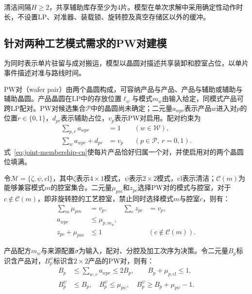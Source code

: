 \documentclass[final,5p,times,twocolumn]{elsarticle}
\begin{document}
清洁间隔$H\ge2$，共享辅助库存至少为4片。模型在单次求解中采用确定性动作时长，不设置LP、对准器、装载锁、旋转腔及真空存储区以外的缓冲。

\subsection{针对两种工艺模式需求的PW对建模}

为同时表示单片驻留与成对搬运，模型以晶圆对描述共享装卸和腔室占位，以单片事件描述对准与路线时间。

PW对（wafer pair）由两个晶圆构成，可容纳产品与产品、产品与辅助或辅助与辅助晶圆。产品晶圆在LP中的存放位置$\ell_w$与模式$m_w$由输入给定，同模式产品可跨LP配对。PW对候选集合$\mathcal P$中的晶圆尚未确定；二元量$a_{wpr}$表示产品$w$进入对$p$的位置$r\in\{0,1\}$，$d_{pr}$表示辅助占位，$v_p$表示PW对启用。配对约束为
\begin{equation}
\begin{aligned}
\sum_{p,r}a_{wpr}&=1 &&(w\in\mathcal W),\\
\sum_w a_{wpr}+d_{pr}&=v_p &&(p\in\mathcal P,\ r=0,1).
\end{aligned}
\label{eq:joint-membership-cn}
\end{equation}
式~\eqref{eq:joint-membership-cn}使每片产品恰好归属一个对，并使启用对的两个晶圆位填满。

令$\mathcal M=\{\zeta,\psi,\mathrm{cl}\}$，其中$\zeta$表示$4\times1$模式，$\psi$表示$2\times2$模式，$\mathrm{cl}$表示清洁；$\mathcal C(m)$为能够兼容模式$m$的腔室集合。二元量$\mu_{pm}$和$z_{pc}$选择PW对的模式与腔室，对于$c\notin\mathcal C(m)$，即非旋转腔的工艺腔室，禁止同时选择模式$m$与腔室$c$，则有：
\begin{equation}
\begin{aligned}
\sum_m\mu_{pm}&=v_p, &\sum_c z_{pc}&=v_p,\\
a_{wpr}&\le\mu_{p,m_w},\\
z_{pc}+\mu_{pm}&\le1 &&(c\notin\mathcal C(m)).
\end{aligned}
\label{eq:joint-chamber-cn}
\end{equation}

产品配方$m_w$与来源配置$\sigma$为输入，配对、分腔及加工次序为决策。令二元量$B_p$标识含产品对，$B_p^{\psi}$标识含$2\times2$产品的PW对，则有：
\begin{equation}
\begin{aligned}
B_p&\le\sum_{w,r}a_{wpr}\le2B_p,\qquad B_p+\mu_{p,\mathrm{cl}}\le1,\\
B_p^{\psi}&\le B_p,\quad B_p^{\psi}\le\mu_{p\psi},\quad
B_p^{\psi}\ge B_p+\mu_{p\psi}-1.
\end{aligned}
\label{eq:pair-type-cn}
\end{equation}
\end{document}
